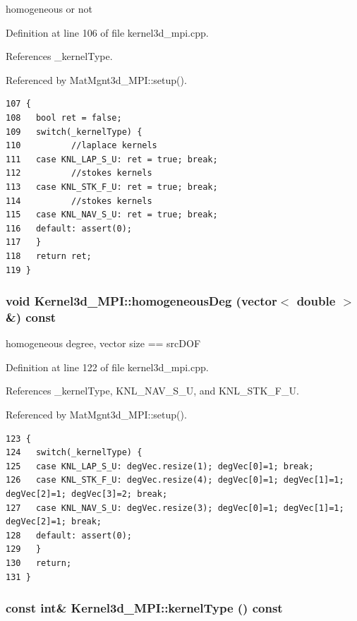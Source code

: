 homogeneous or not 

Definition at line 106 of file kernel3d\_\-mpi.cpp.

References \_\-kernel\-Type.

Referenced by Mat\-Mgnt3d\_\-MPI::setup().

\footnotesize\begin{verbatim}107 {
108   bool ret = false;
109   switch(_kernelType) {
110          //laplace kernels
111   case KNL_LAP_S_U: ret = true; break;
112          //stokes kernels
113   case KNL_STK_F_U: ret = true; break;
114          //stokes kernels
115   case KNL_NAV_S_U: ret = true; break;
116   default: assert(0);
117   }
118   return ret;
119 }
\end{verbatim}\normalsize 


\subsubsection{\setlength{\rightskip}{0pt plus 5cm}void Kernel3d\_\-MPI::homogeneous\-Deg (vector$<$ double $>$ \&) const}\label{classKernel3d__MPI_e80fa2b1a2bc4b94c876c5c455b0ffb5_e80fa2b1a2bc4b94c876c5c455b0ffb5}


homogeneous degree, vector size == src\-DOF 

Definition at line 122 of file kernel3d\_\-mpi.cpp.

References \_\-kernel\-Type, KNL\_\-NAV\_\-S\_\-U, and KNL\_\-STK\_\-F\_\-U.

Referenced by Mat\-Mgnt3d\_\-MPI::setup().

\footnotesize\begin{verbatim}123 {
124   switch(_kernelType) {
125   case KNL_LAP_S_U: degVec.resize(1); degVec[0]=1; break;
126   case KNL_STK_F_U: degVec.resize(4); degVec[0]=1; degVec[1]=1; degVec[2]=1; degVec[3]=2; break;
127   case KNL_NAV_S_U: degVec.resize(3); degVec[0]=1; degVec[1]=1; degVec[2]=1; break;
128   default: assert(0);
129   }
130   return;
131 }
\end{verbatim}\normalsize 


\subsubsection{\setlength{\rightskip}{0pt plus 5cm}const int\& Kernel3d\_\-MPI::kernel\-Type () const\hspace{0.3cm}{\tt  [inline]}}\label{classKernel3d__MPI_f6c825ae8cce01ccc734e4b4abd5d8e0_f6c825ae8cce01ccc734e4b4abd5d8e0}


